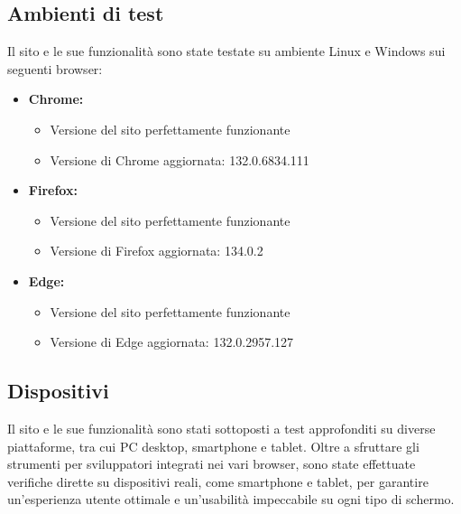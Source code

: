 \subsection{Ambienti di test}
Il sito e le sue funzionalità sono state testate su ambiente Linux e Windows sui seguenti browser:
\begin{itemize}
    \item \textbf{Chrome:}
        \begin{itemize}
            \item Versione del sito perfettamente funzionante
            \item Versione di Chrome aggiornata: 132.0.6834.111
        \end{itemize}
    \item \textbf{Firefox:}
        \begin{itemize}
            \item Versione del sito perfettamente funzionante
            \item Versione di Firefox aggiornata: 134.0.2
        \end{itemize}
    \item \textbf{Edge:} 
        \begin{itemize}
            \item Versione del sito perfettamente funzionante
            \item Versione di Edge aggiornata: 132.0.2957.127
        \end{itemize}
\end{itemize}
\subsection{Dispositivi}
Il sito e le sue funzionalit\`a sono stati sottoposti a test approfonditi su diverse piattaforme, tra cui PC desktop, smartphone e tablet. Oltre a sfruttare gli strumenti per sviluppatori integrati nei vari browser, sono state effettuate verifiche dirette su dispositivi reali, come smartphone e tablet, per garantire un'esperienza utente ottimale e un'usabilità impeccabile su ogni tipo di schermo.
